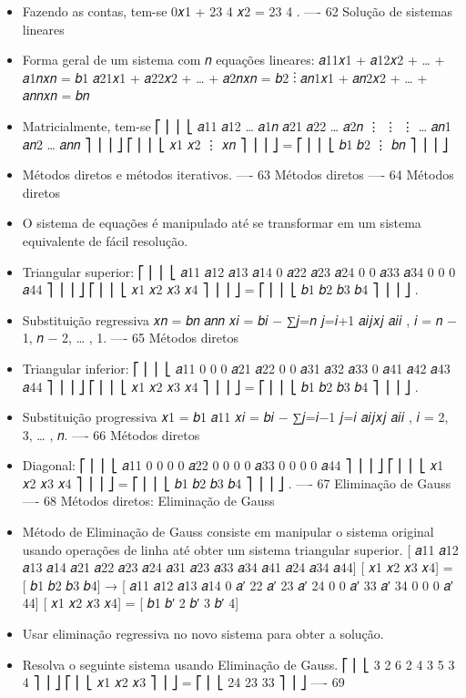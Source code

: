 \documentclass[
]{article}
\providecommand{\tightlist}{%
  \setlength{\itemsep}{0pt}\setlength{\parskip}{0pt}}
\begin{document}
\begin{itemize}
\tightlist
\item
  Fazendo as contas, tem-se 0𝑥1 + 23 4 𝑥2 = 23 4 . ---- 62 Solução de
  sistemas lineares
\item
  Forma geral de um sistema com 𝑛 equações lineares: 𝑎11𝑥1 + 𝑎12𝑥2 +
  \ldots{} + 𝑎1𝑛𝑥𝑛 = 𝑏1 𝑎21𝑥1 + 𝑎22𝑥2 + \ldots{} + 𝑎2𝑛𝑥𝑛 = 𝑏2 ⋮ 𝑎𝑛1𝑥1 +
  𝑎𝑛2𝑥2 + \ldots{} + 𝑎𝑛𝑛𝑥𝑛 = 𝑏𝑛
\item
  Matricialmente, tem-se ⎡ ⎢ ⎢ ⎣ 𝑎11 𝑎12 \ldots{} 𝑎1𝑛 𝑎21 𝑎22 \ldots{}
  𝑎2𝑛 ⋮ ⋮ ⋮ \ldots{} 𝑎𝑛1 𝑎𝑛2 \ldots{} 𝑎𝑛𝑛 ⎤ ⎥ ⎥ ⎦ ⎡ ⎢ ⎢ ⎣ 𝑥1 𝑥2 ⋮ 𝑥𝑛 ⎤ ⎥
  ⎥ ⎦ = ⎡ ⎢ ⎢ ⎣ 𝑏1 𝑏2 ⋮ 𝑏𝑛 ⎤ ⎥ ⎥ ⎦
\item
  Métodos diretos e métodos iterativos. ---- 63 Métodos diretos ---- 64
  Métodos diretos
\item
  O sistema de equações é manipulado até se transformar em um sistema
  equivalente de fácil resolução.
\item
  Triangular superior: ⎡ ⎢ ⎢ ⎣ 𝑎11 𝑎12 𝑎13 𝑎14 0 𝑎22 𝑎23 𝑎24 0 0 𝑎33 𝑎34
  0 0 0 𝑎44 ⎤ ⎥ ⎥ ⎦ ⎡ ⎢ ⎢ ⎣ 𝑥1 𝑥2 𝑥3 𝑥4 ⎤ ⎥ ⎥ ⎦ = ⎡ ⎢ ⎢ ⎣ 𝑏1 𝑏2 𝑏3 𝑏4 ⎤
  ⎥ ⎥ ⎦ .
\item
  Substituição regressiva 𝑥𝑛 = 𝑏𝑛 𝑎𝑛𝑛 𝑥𝑖 = 𝑏𝑖 − ∑𝑗=𝑛 𝑗=𝑖+1 𝑎𝑖𝑗𝑥𝑗 𝑎𝑖𝑖 , 𝑖
  = 𝑛 − 1, 𝑛 − 2, \ldots{} , 1. ---- 65 Métodos diretos
\item
  Triangular inferior: ⎡ ⎢ ⎢ ⎣ 𝑎11 0 0 0 𝑎21 𝑎22 0 0 𝑎31 𝑎32 𝑎33 0 𝑎41
  𝑎42 𝑎43 𝑎44 ⎤ ⎥ ⎥ ⎦ ⎡ ⎢ ⎢ ⎣ 𝑥1 𝑥2 𝑥3 𝑥4 ⎤ ⎥ ⎥ ⎦ = ⎡ ⎢ ⎢ ⎣ 𝑏1 𝑏2 𝑏3 𝑏4
  ⎤ ⎥ ⎥ ⎦ .
\item
  Substituição progressiva 𝑥1 = 𝑏1 𝑎11 𝑥𝑖 = 𝑏𝑖 − ∑𝑗=𝑖−1 𝑗=𝑖 𝑎𝑖𝑗𝑥𝑗 𝑎𝑖𝑖 ,
  𝑖 = 2, 3, \ldots{} , 𝑛. ---- 66 Métodos diretos
\item
  Diagonal: ⎡ ⎢ ⎢ ⎣ 𝑎11 0 0 0 0 𝑎22 0 0 0 0 𝑎33 0 0 0 0 𝑎44 ⎤ ⎥ ⎥ ⎦ ⎡ ⎢
  ⎢ ⎣ 𝑥1 𝑥2 𝑥3 𝑥4 ⎤ ⎥ ⎥ ⎦ = ⎡ ⎢ ⎢ ⎣ 𝑏1 𝑏2 𝑏3 𝑏4 ⎤ ⎥ ⎥ ⎦ . ---- 67
  Eliminação de Gauss ---- 68 Métodos diretos: Eliminação de Gauss
\item
  Método de Eliminação de Gauss consiste em manipular o sistema original
  usando operações de linha até obter um sistema triangular superior.
  {[} 𝑎11 𝑎12 𝑎13 𝑎14 𝑎21 𝑎22 𝑎23 𝑎24 𝑎31 𝑎23 𝑎33 𝑎34 𝑎41 𝑎24 𝑎34 𝑎44{]}
  {[} 𝑥1 𝑥2 𝑥3 𝑥4{]} = {[} 𝑏1 𝑏2 𝑏3 𝑏4{]} → {[} 𝑎11 𝑎12 𝑎13 𝑎14 0 𝑎′ 22
  𝑎′ 23 𝑎′ 24 0 0 𝑎′ 33 𝑎′ 34 0 0 0 𝑎′ 44{]} {[} 𝑥1 𝑥2 𝑥3 𝑥4{]} = {[} 𝑏1
  𝑏′ 2 𝑏′ 3 𝑏′ 4{]}
\item
  Usar eliminação regressiva no novo sistema para obter a solução.
\item
  Resolva o seguinte sistema usando Eliminação de Gauss. ⎡ ⎢ ⎣ 3 2 6 2 4
  3 5 3 4 ⎤ ⎥ ⎦ ⎡ ⎢ ⎣ 𝑥1 𝑥2 𝑥3 ⎤ ⎥ ⎦ = ⎡ ⎢ ⎣ 24 23 33 ⎤ ⎥ ⎦ ---- 69

\end{itemize}
\end{document}
